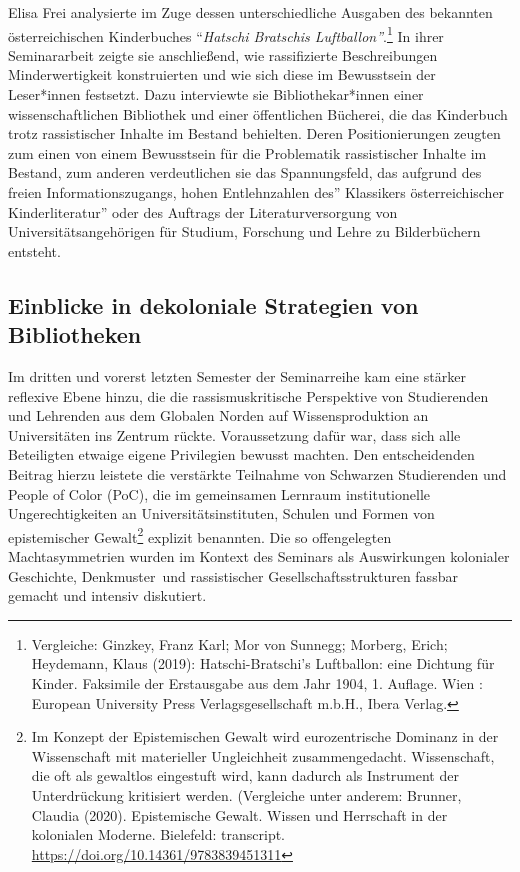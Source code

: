 \documentclass[a4paper,
fontsize=11pt,
oneside,
numbers=noperiodatend,
parskip=half-,
bibliography=totoc,
final
]{scrartcl}
\begin{document}
Elisa Frei analysierte im Zuge dessen unterschiedliche Ausgaben des
bekannten österreichischen Kinderbuches \enquote{\emph{Hatschi Bratschis
Luftballon''}.\footnote{Vergleiche: Ginzkey, Franz Karl; Mor von
  Sunnegg; Morberg, Erich; Heydemann, Klaus (2019): Hatschi-Bratschi's
  Luftballon: eine Dichtung für Kinder. Faksimile der Erstausgabe aus
  dem Jahr 1904, 1. Auflage. Wien : European University Press
  Verlagsgesellschaft m.b.H., Ibera Verlag.} In ihrer Seminararbeit
zeigte sie anschließend, wie rassifizierte Beschreibungen
Minderwertigkeit konstruierten und wie sich diese im Bewusstsein der
Leser*innen festsetzt. Dazu interviewte sie Bibliothekar*innen einer
wissenschaftlichen Bibliothek und einer öffentlichen Bücherei, die das
Kinderbuch trotz rassistischer Inhalte im Bestand behielten. Deren
Positionierungen zeugten zum einen von einem Bewusstsein für die
Problematik rassistischer Inhalte im Bestand, zum anderen verdeutlichen
sie das Spannungsfeld, das aufgrund des freien Informationszugangs,
hohen Entlehnzahlen des} Klassikers österreichischer Kinderliteratur''
oder des Auftrags der Literaturversorgung von Universitätsangehörigen
für Studium, Forschung und Lehre zu Bilderbüchern entsteht.

\hypertarget{einblicke-in-dekoloniale-strategien-von-bibliotheken}{%
\subsection{Einblicke in dekoloniale Strategien von
Bibliotheken}\label{einblicke-in-dekoloniale-strategien-von-bibliotheken}}

Im dritten und vorerst letzten Semester der Seminarreihe kam eine
stärker reflexive Ebene hinzu, die die rassismuskritische Perspektive
von Studierenden und Lehrenden aus dem Globalen Norden auf
Wissensproduktion an Universitäten ins Zentrum rückte. Voraussetzung
dafür war, dass sich alle Beteiligten etwaige eigene Privilegien bewusst
machten. Den entscheidenden Beitrag hierzu leistete die verstärkte
Teilnahme von Schwarzen Studierenden und People of Color (PoC), die im
gemeinsamen Lernraum institutionelle Ungerechtigkeiten an
Universitätsinstituten, Schulen und Formen von epistemischer
Gewalt\footnote{Im Konzept der Epistemischen Gewalt wird eurozentrische
  Dominanz in der Wissenschaft mit materieller Ungleichheit
  zusammengedacht. Wissenschaft, die oft als gewaltlos eingestuft wird,
  kann dadurch als Instrument der Unterdrückung kritisiert werden.
  (Vergleiche unter anderem: Brunner, Claudia (2020). Epistemische
  Gewalt. Wissen und Herrschaft in der kolonialen Moderne. Bielefeld:
  transcript. \url{https://doi.org/10.14361/9783839451311}} explizit
benannten. Die so offengelegten Machtasymmetrien wurden im Kontext des
Seminars als Auswirkungen kolonialer Geschichte, Denkmuster~und
rassistischer Gesellschaftsstrukturen fassbar gemacht und intensiv
diskutiert.
\end{document}
